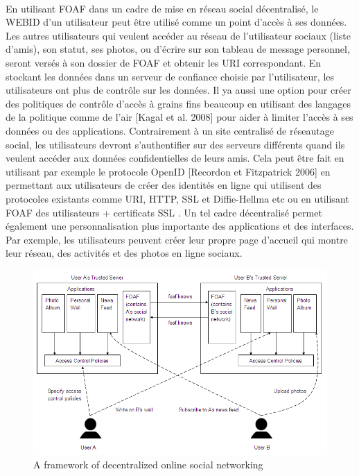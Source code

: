 \paragraph{}
En utilisant FOAF dans un cadre de mise en réseau social décentralisé, le WEBID d'un utilisateur peut être utilisé comme un point d'accès à ses données. Les autres utilisateurs qui veulent accéder au réseau de l'utilisateur sociaux (liste d'amis), son statut, ses photos, ou d'écrire sur son tableau de message personnel, seront versés à son dossier de FOAF et obtenir les URI correspondant. En stockant les données dans un serveur de confiance choisie par l'utilisateur, les utilisateurs ont plus de contrôle sur les données. Il ya aussi une option pour créer des politiques de contrôle d'accès à grains fins beaucoup en utilisant des langages de la politique comme de l'air [Kagal et al. 2008] pour aider à limiter l'accès à ses données ou des applications. Contrairement à un site centralisé de réseautage social, les utilisateurs devront s'authentifier sur des serveurs différents quand ils veulent accéder aux données confidentielles de leurs amis. Cela peut être fait en utilisant par exemple le protocole OpenID [Recordon et Fitzpatrick 2006] en permettant aux utilisateurs de créer des identités en ligne qui utilisent des protocoles existants comme URI, HTTP, SSL et Diffie-Hellma etc ou en utilisant FOAF des utilisateurs + certificats SSL . Un tel cadre décentralisé permet également une personnalisation plus importante des applications et des interfaces. Par exemple, les utilisateurs peuvent créer leur propre page d'accueil qui montre leur réseau, des activités et des photos en ligne sociaux.
\begin{figure}
        \centering
                \centering
                \includegraphics[width=\textwidth]{framework.png}
                \caption{A framework of decentralized online social networking}
                \label{fig:A framework of decentralized online social networking}
       
\end{figure}
\newpage
